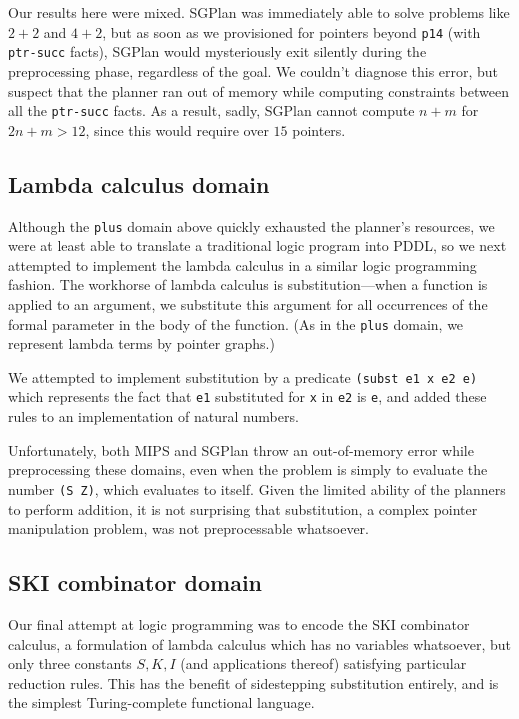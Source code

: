 Our results here were mixed. SGPlan was immediately able to solve problems like
$2+2$ and $4+2$, but as soon as we provisioned for pointers beyond \texttt{p14}
(with \texttt{ptr-succ} facts), SGPlan would mysteriously exit silently during
the preprocessing phase, regardless of the goal. We couldn't diagnose this
error, but suspect that the planner ran out of memory while computing
constraints between all the \texttt{ptr-succ} facts. As a result, sadly, SGPlan
cannot compute $n+m$ for $2n+m>12$, since this would require over $15$ pointers.

\subsection{Lambda calculus domain}

Although the \texttt{plus} domain above quickly exhausted the planner's
resources, we were at least able to translate a traditional logic program into
PDDL, so we next attempted to implement the lambda calculus in a similar logic
programming fashion. The workhorse of lambda calculus is substitution---when a
function is applied to an argument, we substitute this argument for all
occurrences of the formal parameter in the body of the function. (As in the
\texttt{plus} domain, we represent lambda terms by pointer graphs.)

We attempted to implement substitution by a predicate \texttt{(subst e1 x e2 e)}
which represents the fact that \texttt{e1} substituted for \texttt{x} in
\texttt{e2} is \texttt{e}, and added these rules to an implementation of natural
numbers.

Unfortunately, both MIPS and SGPlan throw an out-of-memory error while
preprocessing these domains, even when the problem is simply to evaluate the
number \texttt{(S Z)}, which evaluates to itself. Given the limited ability of
the planners to perform addition, it is not surprising that substitution, a
complex pointer manipulation problem, was not preprocessable whatsoever.

\subsection{SKI combinator domain}

Our final attempt at logic programming was to encode the SKI combinator
calculus, a formulation of lambda calculus which has no variables whatsoever,
but only three constants $S,K,I$ (and applications thereof) satisfying
particular reduction rules. This has the benefit of sidestepping substitution
entirely, and is the simplest Turing-complete functional language.

